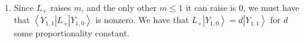 \documentclass[11pt, letterpaper]{article}
\renewcommand{\ket}[1]{\left\vert #1 \right\rangle}
\renewcommand{\bra}[1]{\left\langle #1 \right\vert}
\begin{document}
\begin{enumerate}
\[		\]
		\[
			L_y =\frac{-i\hbar \sqrt{2}}{2} \begin{pmatrix}
			0 & 1 & 0 \\
			-1 & 0 & 1 \\
			0 & -1 & 0
			\end{pmatrix}
		.\]
		Note that
		\[
			L_z \ket{Y_{1,-1} } =-i \hbar \frac{\partial }{\partial \varphi } \frac{1}{2} \sqrt{\frac{3}{2\pi } } e^{-i\varphi } \sin \theta =-\hbar \ket{Y_{1,-1} } 
		,\]
		\[
			L_z\ket{Y_{1,0} } =-i\hbar \frac{\partial }{\partial \varphi } \frac{1}{2} \sqrt{\frac{3}{2\pi } } \cos \theta =0
		.\]
		We are given that $L_z\ket{Y_{1,1} } =\hbar \ket{Y_{1,1} } $. In fact we can just say $L_z \ket{Y_{\ell ,m} } =\hbar m \ket{Y_{\ell ,m} } $ so I don't know why I did this. This gives us
		\[
			L_z =\hbar \begin{pmatrix}
			1 & 0 & 0 \\
			0 & 0 & 0 \\
			0 & 0 & -1
			\end{pmatrix}
		.\]
	\item Since $L_+$ raises $m$, and the only other $m\leq 1$ it can raise is $0$, we must have that $\bra{Y_{1,1} } L_+\ket{Y_{1,0} } $ is nonzero. We have that $L_+\ket{Y_{1,0} } =d\ket{Y_{1,1} } $ for $d$ some proportionality constant.
		

\end{enumerate}
\end{document}
